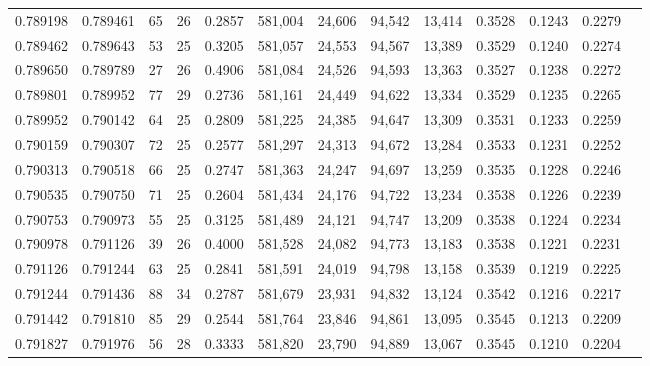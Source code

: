 \begin{tabular}{rrrrrrrrrrrrr}
0.789198 & 0.789461 &    65 &  26 &                                     0.2857 & 581,004 &  24,606 &  94,542 &  13,414 & 0.3528 & 0.1243 & 0.2279 \\
0.789462 & 0.789643 &    53 &  25 &                                     0.3205 & 581,057 &  24,553 &  94,567 &  13,389 & 0.3529 & 0.1240 & 0.2274 \\
0.789650 & 0.789789 &    27 &  26 &                                     0.4906 & 581,084 &  24,526 &  94,593 &  13,363 & 0.3527 & 0.1238 & 0.2272 \\
0.789801 & 0.789952 &    77 &  29 &                                     0.2736 & 581,161 &  24,449 &  94,622 &  13,334 & 0.3529 & 0.1235 & 0.2265 \\
0.789952 & 0.790142 &    64 &  25 &                                     0.2809 & 581,225 &  24,385 &  94,647 &  13,309 & 0.3531 & 0.1233 & 0.2259 \\
0.790159 & 0.790307 &    72 &  25 &                                     0.2577 & 581,297 &  24,313 &  94,672 &  13,284 & 0.3533 & 0.1231 & 0.2252 \\
0.790313 & 0.790518 &    66 &  25 &                                     0.2747 & 581,363 &  24,247 &  94,697 &  13,259 & 0.3535 & 0.1228 & 0.2246 \\
0.790535 & 0.790750 &    71 &  25 &                                     0.2604 & 581,434 &  24,176 &  94,722 &  13,234 & 0.3538 & 0.1226 & 0.2239 \\
0.790753 & 0.790973 &    55 &  25 &                                     0.3125 & 581,489 &  24,121 &  94,747 &  13,209 & 0.3538 & 0.1224 & 0.2234 \\
0.790978 & 0.791126 &    39 &  26 &                                     0.4000 & 581,528 &  24,082 &  94,773 &  13,183 & 0.3538 & 0.1221 & 0.2231 \\
0.791126 & 0.791244 &    63 &  25 &                                     0.2841 & 581,591 &  24,019 &  94,798 &  13,158 & 0.3539 & 0.1219 & 0.2225 \\
0.791244 & 0.791436 &    88 &  34 &                                     0.2787 & 581,679 &  23,931 &  94,832 &  13,124 & 0.3542 & 0.1216 & 0.2217 \\
0.791442 & 0.791810 &    85 &  29 &                                     0.2544 & 581,764 &  23,846 &  94,861 &  13,095 & 0.3545 & 0.1213 & 0.2209 \\
0.791827 & 0.791976 &    56 &  28 &                                     0.3333 & 581,820 &  23,790 &  94,889 &  13,067 & 0.3545 & 0.1210 & 0.2204 \\

\end{tabular}
